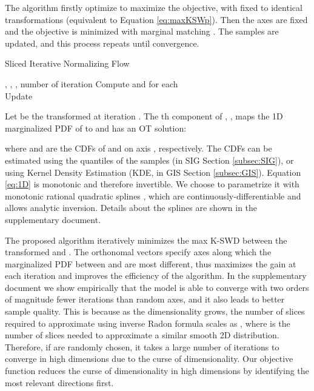\documentclass{article}
\begin{document}
The algorithm firstly optimize  to maximize the objective, with  fixed to identical transformations (equivalent to Equation \ref{eq:maxKSWp}). Then the axes  are fixed and the objective is minimized with  marginal matching . The samples are updated, and this process repeats until convergence.  

\begin{algorithm}[tb]
   \caption{Sliced Iterative Normalizing Flow}
   \label{alg:NF}
\begin{algorithmic}
    , , , number of iteration 
   \STATE 
   \STATE  
   \STATE Compute  and  for each  
   \STATE \\ 
   \STATE 
   \ENDFOR
   \STATE 
   \STATE Update  
   \ENDFOR
\end{algorithmic}
\end{algorithm}

Let  be the transformed  at iteration . The th component of , , maps the 1D marginalized PDF of  to  and has an OT solution:

where  and  are the CDFs of  and  on axis , respectively. The CDFs can be estimated using the quantiles of the samples (in SIG Section \ref{subsec:SIG}), or using Kernel Density Estimation (KDE, in GIS Section \ref{subsec:GIS}). Equation \ref{eq:1D} is monotonic and therefore invertible. We choose to parametrize it with monotonic rational quadratic splines \citep{gregory1982piecewise, durkan2019neural}, which are continuously-differentiable and allows analytic inversion. Details about the splines are shown in the supplementary document.

The proposed algorithm iteratively minimizes the max K-SWD between the transformed  and . The orthonomal vectors  specify  axes along which the marginalized PDF between  and  are most different, thus maximizes the gain at each iteration and improves the efficiency of the algorithm. In the supplementary document we show empirically that the model is able to converge with two orders of magnitude fewer iterations than random axes, and it also leads to better sample quality. This is because as the dimensionality  grows, the number of slices  required to approximate  using inverse Radon formula scales as  \citep{kolouri2015radon}, where  is the number of slices needed to approximate a similar smooth 2D distribution. Therefore, if  are randomly chosen, it takes a large number of iterations to converge in high dimensions due to the curse of dimensionality. Our objective function reduces the curse of dimensionality in high dimensions by identifying the most relevant directions first. 
\end{document}
